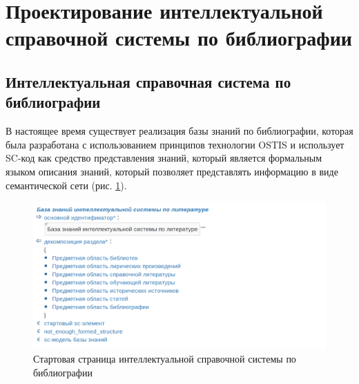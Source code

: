 \section{Проектирование интеллектуальной справочной системы по библиографии}
\label{sec:designing}

\subsection{Интеллектуальная справочная система по библиографии}

В настоящее время существует реализация базы знаний по библиографии, которая была разработана с использованием принципов технологии OSTIS и использует SC-код как средство представления знаний, который является формальным языком описания знаний, который позволяет представлять информацию в виде семантической сети (рис. \ref{fig:bib-start-page}).\cite{OSTISBibliography}

\begin{figure}[H]
    \centering
    \includegraphics[scale=0.59]{imgs/bib-start-page.png}
    \caption{Стартовая страница интеллектуальной справочной системы по библиографии}
    \label{fig:bib-start-page}
\end{figure}

